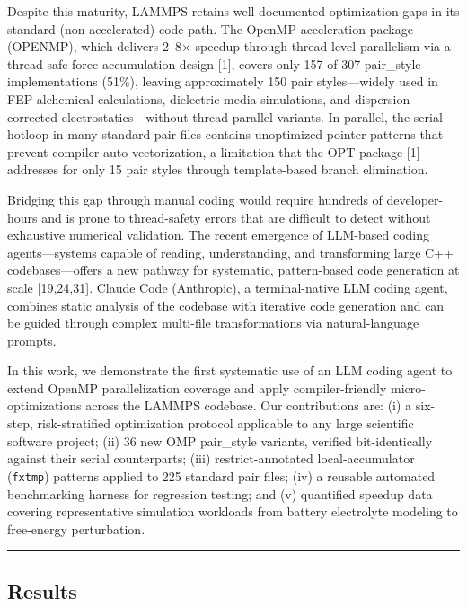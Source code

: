 \documentclass[
  11pt,
]{article}
\begin{document}
Despite this maturity, LAMMPS retains well-documented optimization gaps
in its standard (non-accelerated) code path. The OpenMP acceleration
package (OPENMP), which delivers 2--8× speedup through thread-level
parallelism via a thread-safe force-accumulation design {[}1{]}, covers
only 157 of 307 pair\_style implementations (51\%), leaving
approximately 150 pair styles---widely used in FEP alchemical
calculations, dielectric media simulations, and dispersion-corrected
electrostatics---without thread-parallel variants. In parallel, the
serial hotloop in many standard pair files contains unoptimized pointer
patterns that prevent compiler auto-vectorization, a limitation that the
OPT package {[}1{]} addresses for only 15 pair styles through
template-based branch elimination.

Bridging this gap through manual coding would require hundreds of
developer-hours and is prone to thread-safety errors that are difficult
to detect without exhaustive numerical validation. The recent emergence
of LLM-based coding agents---systems capable of reading, understanding,
and transforming large C++ codebases---offers a new pathway for
systematic, pattern-based code generation at scale {[}19,24,31{]}.
Claude Code (Anthropic), a terminal-native LLM coding agent, combines
static analysis of the codebase with iterative code generation and can
be guided through complex multi-file transformations via
natural-language prompts.

In this work, we demonstrate the first systematic use of an LLM coding
agent to extend OpenMP parallelization coverage and apply
compiler-friendly micro-optimizations across the LAMMPS codebase. Our
contributions are: (i) a six-step, risk-stratified optimization protocol
applicable to any large scientific software project; (ii) 36 new OMP
pair\_style variants, verified bit-identically against their serial
counterparts; (iii) restrict-annotated local-accumulator
(\texttt{fxtmp}) patterns applied to 225 standard pair files; (iv) a
reusable automated benchmarking harness for regression testing; and (v)
quantified speedup data covering representative simulation workloads
from battery electrolyte modeling to free-energy perturbation.

\begin{center}\rule{0.5\linewidth}{0.5pt}\end{center}

\subsection{Results}\label{results}
\end{document}
